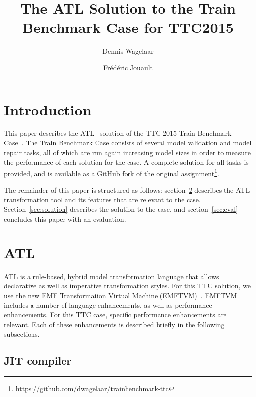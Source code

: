 \documentclass[submission,copyright,creativecommons]{eptcs}
\title{The {ATL} Solution to the Train Benchmark Case for {TTC2015}}
\author{Dennis Wagelaar
\institute{HealthConnect\\
Vilvoorde, Belgium}
\email{dennis.wagelaar@healthconnect.be}
\and
Fr\'{e}d\'{e}ric Jouault
\institute{ESEO-Tech\\
Angers, France}
\email{Frederic.Jouault@eseo.fr}
}
\begin{document}
\maketitle

\begin{abstract}
\end{abstract}

\section{Introduction}
\label{sec:intro}

This paper describes the ATL~\cite{journal/scp/Jouault2008} solution of the TTC 2015 Train Benchmark Case~\cite{conf/ttc/Szarnyas2015}. The Train Benchmark Case consists of several model validation and model repair tasks, all of which are run again increasing model sizes in order to measure the performance of each solution for the case. A complete solution for all tasks is provided, and is available as a GitHub fork of the original assignment\footnote{\url{https://github.com/dwagelaar/trainbenchmark-ttc}}.

The remainder of this paper is structured as follows: section~\ref{sec:atl} describes the ATL transformation tool and its features that are relevant to the case. Section~\ref{sec:solution} describes the solution to the case, and section~\ref{sec:eval} concludes this paper with an evaluation.

\section{ATL}
\label{sec:atl} 

ATL is a rule-based, hybrid model transformation language that allows declarative as well as imperative transformation styles. For this TTC solution, we use the new EMF Transformation Virtual Machine (EMFTVM)~\cite{conf/models/Wagelaar2011}. EMFTVM includes a number of language enhancements, as well as performance enhancements. For this TTC case, specific performance enhancements are relevant. Each of these enhancements is described briefly in the following subsections.

\subsection{JIT compiler}
\end{document}
